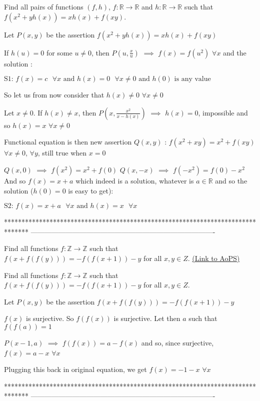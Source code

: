 \begin{solution}
	\begin{tcolorbox}Find all pairs of functions $(f,h)$, $f: \mathbb{R}\to\mathbb{R}$ and $h: \mathbb{R}\to\mathbb{R}$ such that $f(x^2+yh(x))=xh(x)+f(xy)$.\end{tcolorbox}
Let $P(x,y)$ be the assertion $f(x^2+yh(x))=xh(x)+f(xy)$

If $h(u)=0$ for some $u\ne 0$, then $P(u,\frac xu)$ $\implies$ $f(x)=f(u^2)$ $\forall x$ and the solution :

$\boxed{\text{S1: }f(x)=c\text{  }\forall x\text{ and }h(x)=0\text{  }\forall x\ne 0\text{ and }h(0)\text{ is any value}}$

So let us from now consider that $h(x)\ne 0$ $\forall x\ne 0$

Let $x\ne 0$. If $h(x)\ne x$, then $P(x,\frac{x^2}{x-h(x)})$ $\implies$ $h(x)=0$, impossible and so $h(x)=x$ $\forall x\ne 0$

Functional equation is then new assertion $Q(x,y)$ : $f(x^2+xy)=x^2+f(xy)$ $\forall x\ne 0$, $\forall y$, still true when $x=0$

$Q(x,0)$ $\implies$ $f(x^2)=x^2+f(0)$
$Q(x,-x)$ $\implies$ $f(-x^2)=f(0)-x^2$
And so $f(x)=x+a$ which indeed is a solution, whatever is $a\in\mathbb R$ and so the solution ($h(0)=0$ is easy to get):

$\boxed{\text{S2: }f(x)=x+a\text{  }\forall x\text{ and }h(x)=x\text{  }\forall x}$
\end{solution}
*******************************************************************************
-------------------------------------------------------------------------------

\begin{problem}
	Find all functions  $f: \mathbb{Z}\to\mathbb{Z}$ such that $f(x+f(f(y)))=-f(f(x+1))-y$ for all $x,y{\in}Z$.
	\flushright \href{https://artofproblemsolving.com/community/c6h573152}{(Link to AoPS)}
\end{problem}



\begin{solution}
	\begin{tcolorbox}Find all functions  $f: \mathbb{Z}\to\mathbb{Z}$ such that $f(x+f(f(y)))=-f(f(x+1))-y$ for all $x,y{\in}Z$.\end{tcolorbox}
Let $P(x,y)$ be the assertion $f(x+f(f(y)))=-f(f(x+1))-y$

$f(x)$ is surjective. So $f(f(x))$ is surjective. Let then $a$ such that $f(f(a))=1$

$P(x-1,a)$ $\implies$ $f(f(x))=a-f(x)$ and so, since surjective, $f(x)=a-x$ $\forall x$

Plugging this back in original equation, we get $\boxed{f(x)=-1-x}$ $\forall x$
\end{solution}
*******************************************************************************
-------------------------------------------------------------------------------


